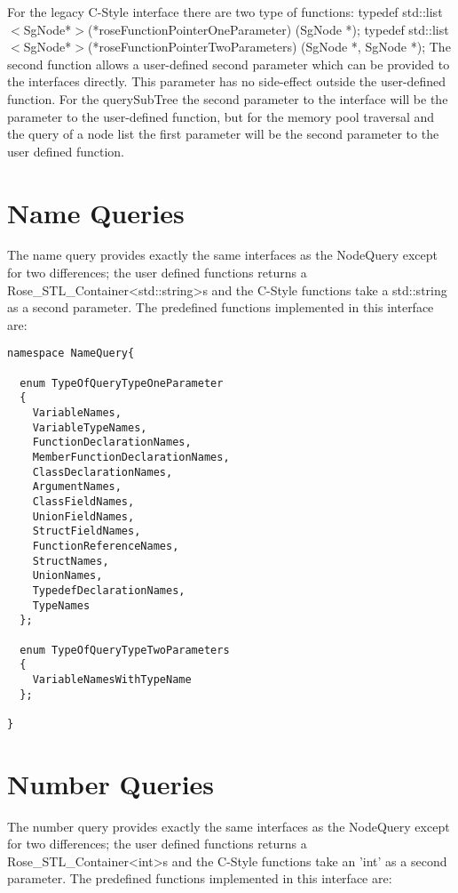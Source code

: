 For the legacy C-Style interface there are two type of functions:
  typedef std::list $<$SgNode*$>$(*roseFunctionPointerOneParameter) (SgNode *);
  typedef std::list $<$SgNode*$>$(*roseFunctionPointerTwoParameters) (SgNode *, SgNode *);
The second function allows a user-defined second parameter which  can be
provided to the interfaces directly. This parameter has no side-effect outside
the user-defined function. For the querySubTree the second parameter to the interface 
will be the parameter to the user-defined function, but for the memory pool
traversal and the query of a node list the first parameter will be the second
parameter to the user defined function.



\section{Name Queries}

The name query provides exactly the same interfaces as the NodeQuery except
for two differences; the user defined functions returns a
Rose_STL_Container<std::string>s and the C-Style functions take a std::string as a
second parameter. The predefined functions implemented in this interface are:

{\mySmallFontSize
\begin{verbatim}
namespace NameQuery{

  enum TypeOfQueryTypeOneParameter
  {
    VariableNames,
    VariableTypeNames,
    FunctionDeclarationNames,
    MemberFunctionDeclarationNames,
    ClassDeclarationNames,
    ArgumentNames,
    ClassFieldNames,
    UnionFieldNames,
    StructFieldNames,
    FunctionReferenceNames,
    StructNames,
    UnionNames,
    TypedefDeclarationNames,
    TypeNames
  };

  enum TypeOfQueryTypeTwoParameters
  {
    VariableNamesWithTypeName
  };

}
\end{verbatim}
}

\section{Number Queries}

The number query provides exactly the same interfaces as the NodeQuery except
for two differences; the user defined functions returns a
Rose_STL_Container<int>s and the C-Style functions take an 'int' as a
second parameter. The predefined functions implemented in this interface are:

